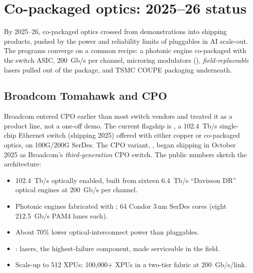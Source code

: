 
\section{Co-packaged optics: 2025--26 status}
\label{sec:cpo-status}

By 2025--26, co-packaged optics crossed from demonstrations into shipping
products, pushed by the power and reliability limits of pluggables in AI
scale-out. The programs converge on a common recipe: a photonic engine
co-packaged with the switch ASIC, 200~Gb/s per channel, microring modulators
(),
\emph{field-replaceable} lasers pulled out of the package, and TSMC COUPE
packaging underneath.

\subsection{Broadcom Tomahawk and CPO}

Broadcom entered CPO earlier than most switch vendors and treated it as a
product line, not a one-off demo. The current flagship is , a
102.4~Tb/s single-chip Ethernet switch (shipping 2025) offered with either copper
or co-packaged optics, on 100G/200G SerDes. The CPO variant, , began shipping in October
2025 as Broadcom's \emph{third-generation} CPO switch. The public numbers sketch
the architecture:

\begin{itemize}
\item 102.4~Tb/s optically enabled, built from sixteen 6.4~Tb/s ``Davisson DR''
      optical engines at 200~Gb/s per channel.
\item Photonic engines fabricated with ; 64 Condor 3\,nm SerDes
      cores (eight 212.5~Gb/s PAM4 lanes each).
\item About 70\% lower optical-interconnect power than pluggables.
\item {}: lasers, the highest-failure
      component, made serviceable in the field.
\item Scale-up to 512 XPUs; 100{,}000+ XPUs in a two-tier fabric at 200~Gb/s/link.
\end{itemize}

